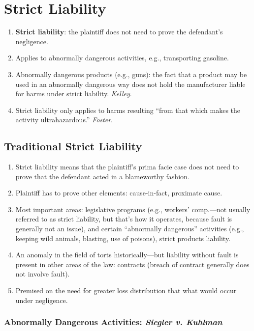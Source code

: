 \section{Strict Liability}

\begin{enumerate}
    \item \textbf{Strict liability}: the plaintiff does not need to prove the 
    defendant's negligence.
    \item Applies to abnormally dangerous activities, e.g., transporting 
    gasoline.
    \item Abnormally dangerous products (e.g., guns): the fact that a product 
    may be used in an abnormally dangerous way does not hold the manufacturer 
    liable for harms under strict liability. \emph{Kelley}.
    \item Strict liability only applies to harms resulting ``from that which 
    makes the activity ultrahazardous.'' \emph{Foster}.
\end{enumerate}

\subsection{Traditional Strict Liability}

\begin{enumerate}
    \item Strict liability means that the plaintiff's prima facie case does not 
    need to prove that the defendant acted in a blameworthy fashion.
    \item Plaintiff has to prove other elements: cause-in-fact, proximate 
    cause.
    \item Most important areas: legislative programs (e.g., workers' 
    comp.---not usually referred to as strict liability, but that's how it 
    operates, because fault is generally not an issue), and certain 
    ``abnormally dangerous'' activities (e.g., keeping wild animals, blasting, 
    use of poisons), strict products liability.
    \item An anomaly in the field of torts historically---but liability 
    without fault is present in other areas of the law: contracts (breach of 
    contract generally does not involve fault).
    \item Premised on the need for greater loss distribution that what would 
    occur under negligence.
\end{enumerate}

\subsubsection{Abnormally Dangerous Activities: \emph{Siegler v. Kuhlman}}

